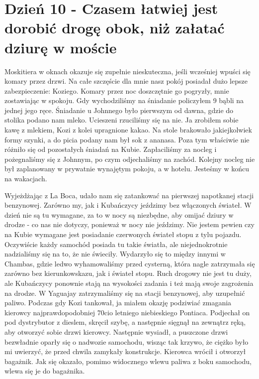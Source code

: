 
\chapter[Czasem łatwiej jest dorobić drogę obok, niż załatać dziurę w moście]{Dzień 10 - Czasem łatwiej jest dorobić drogę obok, niż załatać dziurę w moście}

Moskitiera w oknach okazuje się zupełnie nieskuteczna, jeśli wcześniej wpuści się komary przez drzwi.
Na całe szczęście dla mnie nasz pokój posiadał dużo lepsze zabezpieczenie: Koziego.
Komary przez noc doszczętnie go pogryzły, mnie zostawiając w spokoju.
Gdy wychodziliśmy na śniadanie policzyłem 9 bąbli na jednej jego ręce.
Śniadanie u Johnnego było pierwszym od dawna, gdzie do stolika podano nam mleko.
Ucieszeni rzuciliśmy się na nie.
Ja zrobiłem sobie kawę z mlekiem, Kozi z kolei upragnione kakao.
Na stole brakowało jakiejkolwiek formy szynki, a do picia podany nam był sok z ananasa.
Poza tym właściwie nie różniło się od pozostałych śniadań na Kubie.
Zapłaciliśmy za nocleg i pożegnaliśmy się z Johnnym, po czym odjechaliśmy na zachód.
Kolejny nocleg nie był zaplanowany w prywatnie wynajętym pokoju, a w hotelu.
Jesteśmy w końcu na wakacjach.
\par Wyjeżdżając z La Boca, udało nam się zatankować na pierwszej napotkanej stacji benzynowej.
Zarówno my, jak i Kubańczycy jeździmy bez włączonych świateł.
W dzień nie są tu wymagane, za to w nocy są niezbędne, aby omijać dziury w drodze - co nas nie dotyczy, ponieważ w nocy nie jeździmy.
Nie jestem pewien czy na Kubie wymagane jest posiadanie czerwonych świateł stopu z tylu pojazdu.
Oczywiście każdy samochód posiada tu takie światła, ale niejednokrotnie nadzialiśmy się na to, że nie świeciły.
Wydarzyło się to między innymi w Chambas, gdzie ledwo wyhamowaliśmy przed cysterną, która nagle zatrzymała się zarówno bez kierunkowskazu, jak i świateł stopu.
Ruch drogowy nie jest tu duży, ale Kubańczycy ponownie stają na wysokości zadania i też mają swoje zagrożenia na drodze.
W Yaguajay zatrzymaliśmy się na stacji benzynowej, aby uzupełnić paliwo.
Podczas gdy Kozi tankował, ja miałem okazję podziwiać zmagania kierowcy najprawdopodobniej 70cio letniego niebieskiego Pontiaca.
Podjechał on pod dystrybutor z dieslem, skręcił szybę, a następnie sięgnął na zewnątrz ręką, aby otworzyć sobie drzwi kierowcy.
Następnie wysiadł, a puszczone drzwi bezwładnie oparły się o nadwozie samochodu, wisząc tak krzywo, że ciężko było mi uwierzyć, że przed chwila zamykały konstrukcje.
Kierowca wrócił i otworzył bagażnik.
Jak się okazało, pomimo widocznego wlewu paliwa z boku samochodu, wlewa się je do bagażnika.
